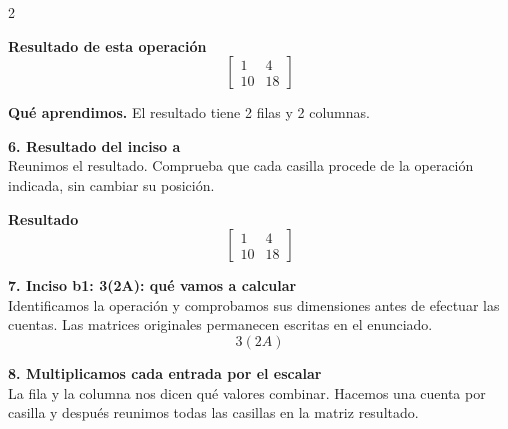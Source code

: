 \documentclass[11pt,a4paper,landscape]{article}
\begin{document}
\begin{multicols*}{2}
\begin{minipage}{\linewidth}
\par\smallskip \textbf{Resultado de esta operación}\[\begin{bmatrix}1 & 4\\10 & 18\end{bmatrix}\]
\par\smallskip\textbf{Qué aprendimos.} El resultado tiene 2 filas y 2 columnas.
\end{minipage}\par\medskip
\noindent\begin{minipage}{\linewidth}\textbf{6. Resultado del inciso a}\\[2pt]Reunimos el resultado. Comprueba que cada casilla procede de la operación indicada, sin cambiar su posición.
\par\smallskip \textbf{Resultado}\[\begin{bmatrix}1 & 4\\10 & 18\end{bmatrix}\]
\end{minipage}\par\medskip
\noindent\begin{minipage}{\linewidth}\textbf{7. Inciso b1: 3(2A): qué vamos a calcular}\\[2pt]Identificamos la operación y comprobamos sus dimensiones antes de efectuar las cuentas. Las matrices originales permanecen escritas en el enunciado.
\[3(2A)\]
\end{minipage}\par\medskip
\noindent\begin{minipage}{\linewidth}\textbf{8. Multiplicamos cada entrada por el escalar}\\[2pt]La fila y la columna nos dicen qué valores combinar. Hacemos una cuenta por casilla y después reunimos todas las casillas en la matriz resultado.
\par{}\par\smallskip

\end{minipage}
\end{multicols*}
\end{document}
